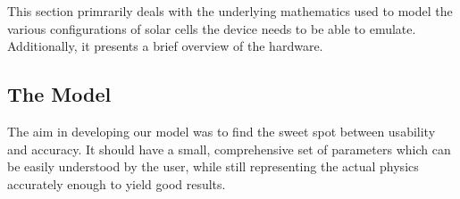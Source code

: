 
This section  primrarily deals with  the underlying mathematics used  to model
the  various configurations  of solar  cells the  device needs  to be  able to
emulate. Additionally, it presents a brief overview of the hardware.

%


\subsection{The Model}

The aim in developing  our model was to find the  sweet spot between usability
and  accuracy. It  should  have  a  small,  comprehensive  set  of  parameters
which  can be  easily understood  by the  user, while  still representing  the
actual physics  accurately enough to  yield good results.


